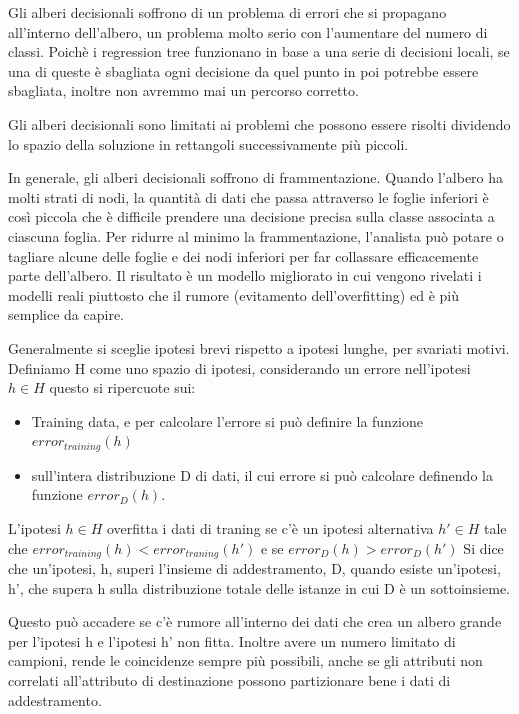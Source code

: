 \documentclass[a4paper]{extarticle}
\begin{document}
Gli alberi decisionali soffrono di un problema di errori che si propagano all'interno dell'albero, un problema molto serio con l'aumentare del numero di classi. Poichè i regression tree funzionano in base a una serie di decisioni locali, se una di queste è sbagliata ogni decisione da quel punto in poi potrebbe essere sbagliata, inoltre non avremmo mai un percorso corretto.

Gli alberi decisionali sono limitati ai problemi che possono essere risolti dividendo lo spazio della soluzione in rettangoli successivamente più piccoli.


In generale, gli alberi decisionali soffrono di frammentazione. Quando l'albero ha molti strati di nodi, la quantità di dati che passa attraverso le foglie inferiori è così piccola che è difficile prendere una decisione precisa sulla classe associata a ciascuna foglia. Per ridurre al minimo la frammentazione, l'analista può potare o tagliare alcune delle foglie e dei nodi inferiori per far collassare efficacemente parte dell'albero. Il risultato è un modello migliorato in cui vengono rivelati i modelli reali piuttosto che il rumore (evitamento dell'overfitting) ed è più semplice da capire.

Generalmente si sceglie ipotesi brevi rispetto a ipotesi lunghe, per svariati motivi. Definiamo H come uno spazio di ipotesi, considerando un errore  nell'ipotesi $h \in H$ questo si ripercuote sui:
\begin{itemize}
\item Training data, e per calcolare l'errore si può definire la funzione $error_{training}(h)$
\item sull'intera distribuzione D di dati, il cui errore si può calcolare definendo la funzione $error_D(h)$.
\end{itemize} 

L'ipotesi $h \in H$ overfitta i dati di traning se c'è un ipotesi alternativa $h' \in H$ tale che $error_{training}(h)<error_{traning}(h')$ e se $error_D(h)>error_D(h')$ Si dice che un'ipotesi, h, superi l'insieme di addestramento, D, quando esiste un'ipotesi, h', che supera h sulla distribuzione totale delle istanze in cui D è un sottoinsieme.

Questo può accadere se c'è rumore all'interno dei dati che crea un albero grande per l'ipotesi h e l'ipotesi h' non fitta. Inoltre avere un numero limitato di campioni, rende le coincidenze sempre più possibili, anche se gli attributi non correlati all'attributo di destinazione possono partizionare bene i dati di addestramento.
\end{document}
